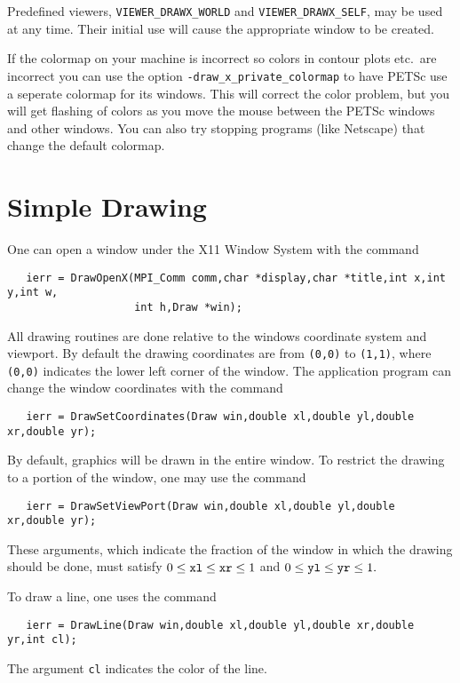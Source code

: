   
Predefined viewers, {\tt VIEWER\_DRAWX\_WORLD} 
and {\tt VIEWER\_DRAWX\_SELF}, may be used at any time. Their initial
use will cause the appropriate window to be created.

\medskip
If the colormap on your machine is incorrect so colors in contour plots
etc.~are incorrect you can use the option {\tt -draw\_x\_private\_colormap}
 to have PETSc use a seperate colormap
for its windows. This will correct the color problem, but you will get
flashing of colors as you move the mouse between the PETSc windows and other 
windows. You can also try stopping programs (like Netscape) that change the 
default colormap.

\section{Simple Drawing}

One can open a window under the X11 Window System with the
command  
\begin{verbatim}
   ierr = DrawOpenX(MPI_Comm comm,char *display,char *title,int x,int y,int w,
                    int h,Draw *win);
\end{verbatim}
All drawing routines are done relative to the windows coordinate system 
and viewport. By default the drawing coordinates are from {\tt (0,0)} to 
{\tt (1,1)}, where {\tt (0,0)} indicates the lower left corner of the 
window. The application program can change the window coordinates with the 
command  
\begin{verbatim}
   ierr = DrawSetCoordinates(Draw win,double xl,double yl,double xr,double yr);
\end{verbatim}
By default, graphics will be drawn in the entire window. To restrict the 
drawing to a portion of the window, one may 
use the command 
\begin{verbatim}
   ierr = DrawSetViewPort(Draw win,double xl,double yl,double xr,double yr);
\end{verbatim}
These arguments, which indicate the fraction of the window in which the 
drawing should be done, must satisfy 
$ 0 \le {\tt xl} \le {\tt xr} \le 1 $ and $ 0 \le {\tt yl} \le {\tt yr} \le 1.$ 

To draw a line, one uses
 the command  
\begin{verbatim}
   ierr = DrawLine(Draw win,double xl,double yl,double xr,double yr,int cl);
\end{verbatim}
The argument {\tt cl} indicates the color of the line.

